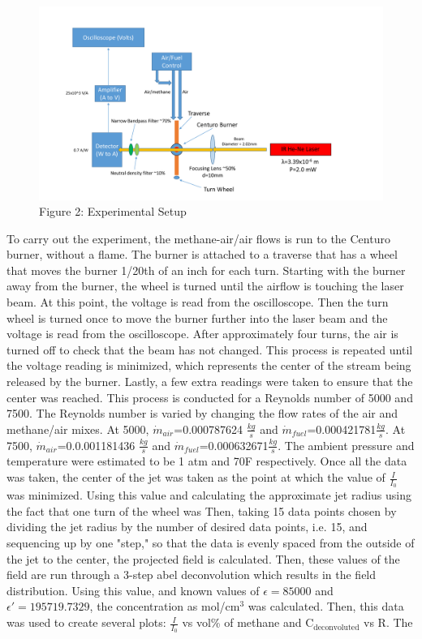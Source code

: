 \documentclass{article}
\begin{document}
\begin{figure}[h]
    \centering
    \includegraphics[width=\textwidth]{Lab1Diagram.pdf}
    \caption*{\footnotesize{Figure 2: Experimental Setup}}
\end{figure}
\indent To carry out the experiment, the methane-air/air flows is run to the Centuro burner, without a flame.  The burner is attached to a traverse that has a wheel that moves the burner 1/20th of an inch for each turn. Starting with the burner away from the burner, the wheel is turned until the airflow is touching the laser beam.  At this point, the voltage is read from the oscilloscope.  Then the turn wheel is turned once to move the burner further into the laser beam and the voltage is read from the oscilloscope.  After approximately four turns, the air is turned off to check that the beam has not changed.  This process is repeated until the voltage reading is minimized, which represents the center of the stream being released by the burner.  Lastly, a few extra readings were taken to ensure that the center was reached.\newline
\indent This process is conducted for a Reynolds number of 5000 and 7500.  The Reynolds number is varied by changing the flow rates of the air and methane/air mixes. At 5000, $\dot{m}_{air}$=0.000787624 $\frac{kg}{s}$ and $\dot{m}_{fuel}$=0.000421781$\frac{kg}{s}$.   At 7500, $\dot{m}_{air}$=0.0.001181436 $\frac{kg}{s}$ and $\dot{m}_{fuel}$=0.000632671$\frac{kg}{s}$.  The ambient pressure and temperature were estimated to be 1 atm and 70\degree F respectively.\newline
\indent Once all the data was taken, the center of the jet was taken as the point at which the value of $\frac{I}{I_0}$ was minimized.  Using this value and calculating the approximate jet radius using the fact that one turn of the wheel was Then, taking 15 data points chosen by dividing the jet radius by the number of desired data points, i.e. 15, and sequencing up by one "step," so that the data is evenly spaced from the outside of the jet to the center, the projected field is calculated. Then, these values of the field are run through a 3-step abel deconvolution which results in the field distribution. \newline
\indent Using this value, and known values of $\epsilon=85000$ and $\epsilon '=195719.7329$, the concentration as mol/cm$^3$ was calculated.  Then, this data was used to create several plots: $\frac{I}{I_0}$ vs vol\% of methane and C$_\textrm{deconvoluted}$ vs R.  The 
\newpage
\end{document}
